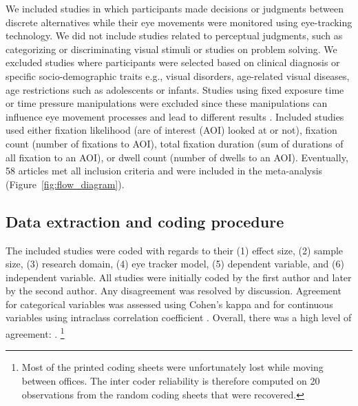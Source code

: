 \documentclass{article}
\begin{document}
We included studies in which participants made decisions or judgments between discrete alternatives while their eye movements were monitored using eye-tracking technology. We did not include studies related to perceptual judgments, such as categorizing or discriminating visual stimuli or studies on problem solving. We excluded studies where participants were selected based on clinical diagnosis or specific socio-demographic traits e.g., visual disorders, age-related visual diseases, age restrictions such as adolescents or infants. Studies using fixed exposure time or time pressure manipulations were excluded since these manipulations can influence eye movement processes \citep{orquin2018a} and lead to different results \citep{simola2019a}. Included studies used either fixation likelihood (are of interest (AOI) looked at or not), fixation count (number of fixations to AOI), total fixation duration (sum of durations of all fixation to an AOI), or dwell count (number of dwells to an AOI). Eventually, 58 articles met all inclusion criteria and were included in the meta-analysis (Figure~\ref{fig:flow_diagram}).


\subsection{Data extraction and coding procedure}

The included studies were coded with regards to their (1) effect size, (2) sample size, (3) research domain, (4) eye tracker model, (5) dependent variable, and (6) independent variable. All studies were initially coded by the first author and later by the second author. Any disagreement was resolved by discussion. Agreement for categorical variables was assessed using Cohen's kappa and for continuous variables using intraclass correlation coefficient \citep{shrout1979a}. Overall, there was a high level of agreement: .%
%
\footnote{Most of the printed coding sheets were unfortunately lost while moving between offices. The inter coder reliability is therefore computed on 20 observations from the random coding sheets that were recovered.}
\end{document}
